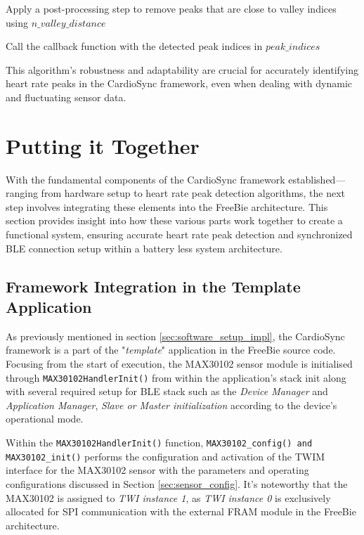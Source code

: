 \begin{algorithm}[H]
\begin{algorithmic}[1]
    \State Apply a post-processing step to remove peaks that are close to valley indices using $n\_valley\_distance$
    
    \State Call the callback function with the detected peak indices in $peak\_indices$
    
\EndFunction
\end{algorithmic}
\end{algorithm}

\noindent This algorithm's robustness and adaptability are crucial for accurately identifying heart rate peaks in the CardioSync framework, even when dealing with dynamic and fluctuating sensor data.

\section{Putting it Together}
With the fundamental components of the CardioSync framework established—ranging from hardware setup to heart rate peak detection algorithms, the next step involves integrating these elements into the FreeBie architecture. This section provides insight into how these various parts work together to create a functional system, ensuring accurate heart rate peak detection and synchronized BLE connection setup within a battery less system architecture.

\subsection{Framework Integration in the Template Application}
As previously mentioned in section \ref{sec:software_setup_impl}, the CardioSync framework is a part of the "\textit{template}" application in the FreeBie source code. Focusing from the start of execution, the MAX30102 sensor module is initialised through \texttt{MAX30102HandlerInit()} from within the application's stack init along with several required setup for BLE stack such as the \textit{Device Manager} and \textit{Application Manager}, \textit{Slave or Master initialization} according to the device's operational mode.

\noindent Within the \texttt{MAX30102HandlerInit()} function, \texttt{MAX30102\_config() and MAX30102\_init()} performs the configuration and activation of the TWIM interface for the MAX30102 sensor with  the parameters and operating configurations discussed in Section \ref{sec:sensor_config}. It's noteworthy that the MAX30102 is assigned to \textit{TWI instance 1}, as \textit{TWI instance 0} is exclusively allocated for SPI communication with the external FRAM module in the FreeBie architecture.

